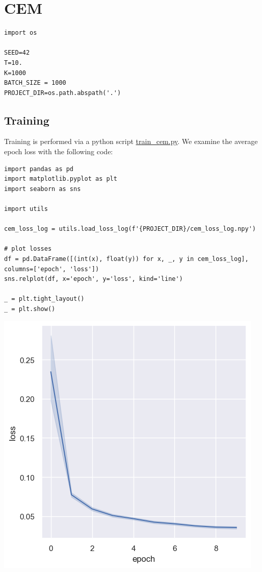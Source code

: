 \documentclass[a4paper, 11pt]{article}
\begin{document}
\section{CEM}
\label{sec:org0291c11}
\begin{verbatim}
import os

SEED=42
T=10.
K=1000
BATCH_SIZE = 1000
PROJECT_DIR=os.path.abspath('.')
\end{verbatim}
\subsection{Training}
\label{sec:orgeaa0634}
Training is performed via a python script \url{train\_cem.py}. We examine the average epoch loss with the following code:
\begin{verbatim}
import pandas as pd
import matplotlib.pyplot as plt
import seaborn as sns

import utils

cem_loss_log = utils.load_loss_log(f'{PROJECT_DIR}/cem_loss_log.npy')

# plot losses
df = pd.DataFrame([(int(x), float(y)) for x, _, y in cem_loss_log], columns=['epoch', 'loss'])
sns.relplot(df, x='epoch', y='loss', kind='line')

_ = plt.tight_layout()
_ = plt.show()
\end{verbatim}

\begin{center}
\includegraphics[width=.9\linewidth]{./.ob-jupyter/6a99d9467be35764e879e334f59da6c04468e95f.png}
\end{center}
\end{document}
